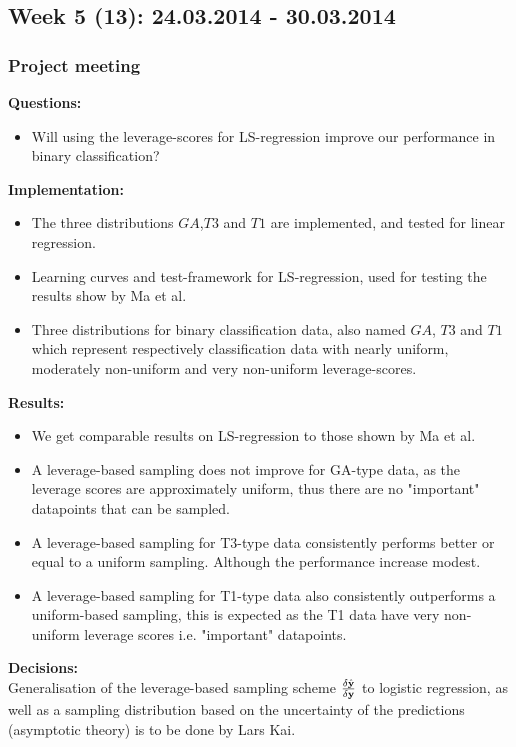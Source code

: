 \documentclass[11pt, a4paper]{article} %
\begin{document}
\subsection*{Week 5 (13): 24.03.2014 - 30.03.2014}
\subsubsection*{Project meeting}
\textbf{Questions:}\\
\begin{itemize}
\item Will using the leverage-scores for LS-regression improve our performance in binary classification?
\end{itemize}

\textbf{Implementation:}\\
\begin{itemize}
\item The three distributions $GA$,$T3$ and $T1$ are implemented, and tested for linear regression.
\item Learning curves and test-framework for LS-regression, used for testing the results show by Ma et al.
\item Three distributions for binary classification data, also named $GA$, $T3$ and $T1$ which represent respectively classification data with nearly uniform, moderately non-uniform and very non-uniform leverage-scores.
\end{itemize}

\textbf{Results:}\\
\begin{itemize}
\item We get comparable results on LS-regression to those shown by Ma et al.
\item A leverage-based sampling does not improve for GA-type data, as the leverage scores are approximately uniform, thus there are no "important" datapoints that can be sampled.
\item A leverage-based sampling for T3-type data consistently performs better or equal to a uniform sampling. Although the performance increase modest.
\item A leverage-based sampling for T1-type data also consistently outperforms a uniform-based sampling, this is expected as the T1 data have very non-uniform leverage scores i.e. "important" datapoints. 
\end{itemize}

\textbf{Decisions:}\\
Generalisation of the leverage-based sampling scheme $\frac{\delta \hat{{\bf y}}}{\delta {\bf y}}$ to logistic regression, as well as a sampling distribution based on the uncertainty of the predictions (asymptotic theory) is to be done by Lars Kai.
\end{document}

